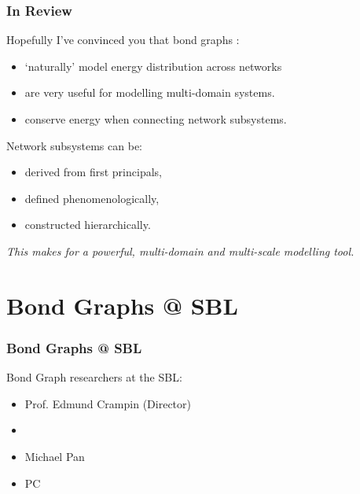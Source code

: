 \documentclass[11pt,reqno]{beamer}
\begin{document}
\begin{frame}
\frametitle{In Review}
Hopefully I've convinced you that bond graphs :
\begin{itemize}
	\item `naturally' model energy distribution across networks
	\item are very useful for modelling multi-domain systems.
	\item conserve energy when connecting network subsystems.
\end{itemize}
\vspace{22pt}

Network subsystems can be:
\begin{itemize}
	\item derived from first principals,
	\item defined phenomenologically, 
	\item constructed hierarchically.
\end{itemize}
\emph{This makes for a powerful, multi-domain and multi-scale modelling tool.}
\end{frame}
\section{Bond Graphs @ SBL}
\begin{frame}
\frametitle{Bond Graphs @ SBL}
Bond Graph researchers at the SBL:
\begin{itemize}
	\item Prof. Edmund Crampin (Director)
	\item {} \only<2>{\emph{Prof. Peter Gawthrop}}
	\item Michael Pan
	\item PC
\end{itemize}
\end{frame}
\end{document}

